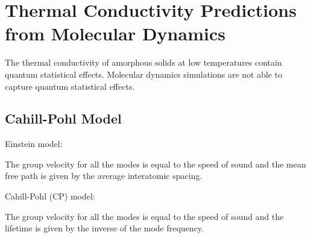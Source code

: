 \documentclass[aps,prb,preprint,superscriptaddress,amsmath,amssymb,floatfix]{revtex4}
\begin{document}
\section{\label{S:Lifetimes}Thermal Conductivity Predictions from 
Molecular Dynamics}
The thermal conductivity of amorphous solids at low temperatures contain 
quantum statistical effects.\cite{freeman_thermal_1986} Molecular dynamics 
simulations are not able to capture quantum statistical effects.



\subsection{\label{S:Lifetimes:}Cahill-Pohl Model}
Einstein model:

The group velocity for all the modes is equal to the speed of sound and the 
mean free path is given by the average interatomic spacing.
\cite{kittel_interpretation_1949,cahill_lower_1992}

Cahill-Pohl (CP) model:

The group velocity for all the modes is equal to the speed of sound and 
the lifetime is given by the inverse of the mode frequency.
\cite{cahill_lower_1992}
\end{document}

